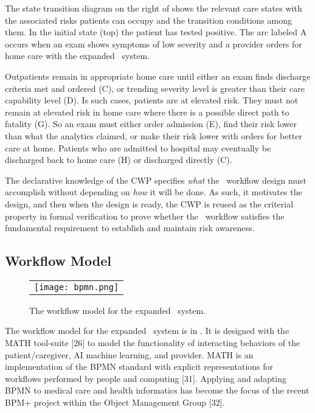 The state transition diagram on the right of  shows the relevant care states with the associated risks patients can occupy and the transition conditions among them. In the initial state (top) the patient has tested positive. The arc labeled A occurs when an exam shows symptoms of low severity and a provider orders for home care with the expanded \phware\ system. 

Outpatients remain in appropriate home care until either an exam finds discharge criteria met and ordered (C), or trending severity level is greater than their care capability level (D). Is such cases, patients are at elevated risk. They must not remain at elevated risk in home care where there is a possible direct path to fatality (G). So an exam must either order admission (E), find their risk lower than what the analytics claimed, or make their risk lower with orders for better care at home. Patients who are admitted to hospital may eventually be discharged back to home care (H) or discharged directly (C). 

The declarative knowledge of the CWP specifies \emph{what} the \phware\ workflow design must accomplish without depending on \emph{how} it will be done. As such, it motivates the design, and then when the design is ready, the CWP is reused as the criterial property in formal verification to prove whether the \phware\ workflow satisfies the fundamental requirement to establish and maintain risk awareness. 

\subsection{Workflow Model}
\begin{figure*}
  \begin{center}
    \begin{tabular}{c}
      \texttt{[image: bpmn.png]}
    \end{tabular}
  \end{center}
\caption{The workflow model for the expanded \phware\ system.}
\label{fig:bpmn}
\end{figure*}

The workflow model for the expanded \phware\ system is in . It is designed with the MATH tool-suite [26] to model the functionality of interacting behaviors of the patient/caregiver, AI machine learning, and provider. MATH is an implementation of the BPMN standard with explicit representations for workflows performed by people and computing [31]. Applying and adapting BPMN to medical care and health informatics has become the focus of the recent BPM+ project within the Object Management Group [32]. 


